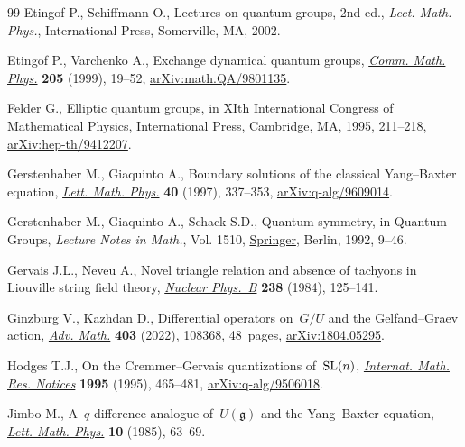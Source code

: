 \begin{thebibliography}{99}
Etingof P., Schiffmann O., Lectures on quantum groups, 2nd ed., \textit{Lect. Math. Phys.}, International Press, Somerville, MA, 2002.

Etingof P., Varchenko A., Exchange dynamical quantum groups, \href{https://doi.org/10.1007/s002200050665}{\textit{Comm.
 Math. Phys.}} \textbf{205} (1999), 19--52, \href{https://arxiv.org/abs/math.QA/9801135}{arXiv:math.QA/9801135}.

Felder G., Elliptic quantum groups, in X{I}th {I}nternational {C}ongress of
 {M}athematical {P}hysics, International Press, Cambridge, MA, 1995, 211--218,
 \href{https://arxiv.org/abs/hep-th/9412207}{arXiv:hep-th/9412207}.

Gerstenhaber M., Giaquinto A., Boundary solutions of the classical
 {Y}ang--{B}axter equation, \href{https://doi.org/10.1023/A:1007363911649}{\textit{Lett. Math. Phys.}} \textbf{40} (1997),
 337--353, \href{https://arxiv.org/abs/q-alg/9609014}{arXiv:q-alg/9609014}.

Gerstenhaber M., Giaquinto A., Schack S.D., Quantum symmetry, in Quantum
 {G}roups, \textit{Lecture Notes in Math.}, Vol. 1510, \href{https://doi.org/10.1007/BFb0101176}{Springer}, Berlin, 1992,
 9--46.

Gervais J.L., Neveu A., Novel triangle relation and absence of tachyons in
 {L}iouville string field theory, \href{https://doi.org/10.1016/0550-3213(84)90469-3}{\textit{Nuclear Phys.~B}} \textbf{238}
 (1984), 125--141.

Ginzburg V., Kazhdan D., Differential operators on~{$G/U$} and the
 {G}elfand--{G}raev action, \href{https://doi.org/10.1016/j.aim.2022.108368}{\textit{Adv. Math.}} \textbf{403} (2022), 108368,
 48~pages, \href{https://arxiv.org/abs/1804.05295}{arXiv:1804.05295}.

Hodges T.J., On the {C}remmer--{G}ervais quantizations of~{${\rm SL}(n)$},
  \href{https://doi.org/10.1155/S107379289500033X}{\textit{Internat. Math. Res. Notices}} \textbf{1995} (1995), 465--481,
 \href{https://arxiv.org/abs/q-alg/9506018}{arXiv:q-alg/9506018}.

Jimbo M., A~{$q$}-difference analogue of~{$U({\mathfrak{g}})$} and the
 {Y}ang--{B}axter equation, \href{https://doi.org/10.1007/BF00704588}{\textit{Lett. Math. Phys.}} \textbf{10} (1985),
 63--69.


\end{thebibliography}
